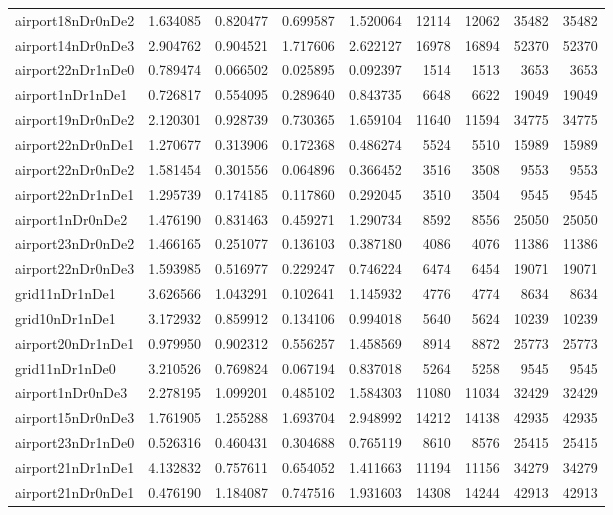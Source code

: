 \begin{longtable}{|l|r|r|r|r|r|r|r|r|}
airport18nDr0nDe2 & 1.634085 & 0.820477 & 0.699587 & 1.520064 & 12114 & 12062 & 35482 & 35482 \\
airport14nDr0nDe3 & 2.904762 & 0.904521 & 1.717606 & 2.622127 & 16978 & 16894 & 52370 & 52370 \\
airport22nDr1nDe0 & 0.789474 & 0.066502 & 0.025895 & 0.092397 & 1514 & 1513 & 3653 & 3653 \\
airport1nDr1nDe1 & 0.726817 & 0.554095 & 0.289640 & 0.843735 & 6648 & 6622 & 19049 & 19049 \\
airport19nDr0nDe2 & 2.120301 & 0.928739 & 0.730365 & 1.659104 & 11640 & 11594 & 34775 & 34775 \\
airport22nDr0nDe1 & 1.270677 & 0.313906 & 0.172368 & 0.486274 & 5524 & 5510 & 15989 & 15989 \\
airport22nDr0nDe2 & 1.581454 & 0.301556 & 0.064896 & 0.366452 & 3516 & 3508 & 9553 & 9553 \\
airport22nDr1nDe1 & 1.295739 & 0.174185 & 0.117860 & 0.292045 & 3510 & 3504 & 9545 & 9545 \\
airport1nDr0nDe2 & 1.476190 & 0.831463 & 0.459271 & 1.290734 & 8592 & 8556 & 25050 & 25050 \\
airport23nDr0nDe2 & 1.466165 & 0.251077 & 0.136103 & 0.387180 & 4086 & 4076 & 11386 & 11386 \\
airport22nDr0nDe3 & 1.593985 & 0.516977 & 0.229247 & 0.746224 & 6474 & 6454 & 19071 & 19071 \\
grid11nDr1nDe1 & 3.626566 & 1.043291 & 0.102641 & 1.145932 & 4776 & 4774 & 8634 & 8634 \\
grid10nDr1nDe1 & 3.172932 & 0.859912 & 0.134106 & 0.994018 & 5640 & 5624 & 10239 & 10239 \\
airport20nDr1nDe1 & 0.979950 & 0.902312 & 0.556257 & 1.458569 & 8914 & 8872 & 25773 & 25773 \\
grid11nDr1nDe0 & 3.210526 & 0.769824 & 0.067194 & 0.837018 & 5264 & 5258 & 9545 & 9545 \\
airport1nDr0nDe3 & 2.278195 & 1.099201 & 0.485102 & 1.584303 & 11080 & 11034 & 32429 & 32429 \\
airport15nDr0nDe3 & 1.761905 & 1.255288 & 1.693704 & 2.948992 & 14212 & 14138 & 42935 & 42935 \\
airport23nDr1nDe0 & 0.526316 & 0.460431 & 0.304688 & 0.765119 & 8610 & 8576 & 25415 & 25415 \\
airport21nDr1nDe1 & 4.132832 & 0.757611 & 0.654052 & 1.411663 & 11194 & 11156 & 34279 & 34279 \\
airport21nDr0nDe1 & 0.476190 & 1.184087 & 0.747516 & 1.931603 & 14308 & 14244 & 42913 & 42913 \\

\end{longtable}
